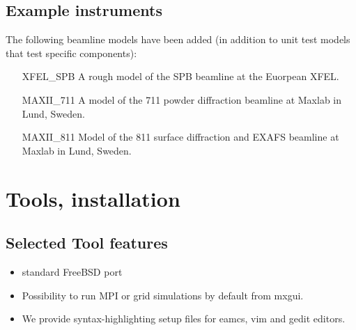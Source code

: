 \subsection{Example instruments}
The following beamline models have been added (in addition to unit test models that test specific components):
\begin{itemize}
  \item[XFEL\_SPB] A rough model of the SPB beamline at the Euorpean XFEL.
  \item[MAXII\_711] A model of the 711 powder diffraction beamline at Maxlab in Lund, Sweden.
  \item[MAXII\_811] Model of the 811 surface diffraction and EXAFS beamline at Maxlab in Lund, Sweden.
\end{itemize}


\section{Tools, installation}
\label{s:new-features:tools}
\subsection{Selected Tool features}
\begin{itemize}
  \item standard FreeBSD port
  \item Possibility to run MPI or grid simulations by default from mxgui.
  \item We provide syntax-highlighting setup files for eamcs, vim and gedit editors.
\end{itemize}

